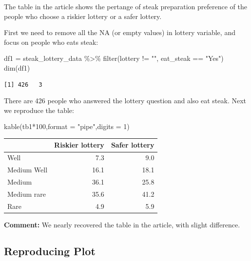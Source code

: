 \documentclass[
  letterpaper,
  DIV=11,
  numbers=noendperiod]{scrartcl}
\newenvironment{Shaded}{\begin{snugshade}}{\end{snugshade}}
\newcommand{\AttributeTok}[1]{\textcolor[rgb]{0.40,0.45,0.13}{#1}}
\newcommand{\DecValTok}[1]{\textcolor[rgb]{0.68,0.00,0.00}{#1}}
\newcommand{\FunctionTok}[1]{\textcolor[rgb]{0.28,0.35,0.67}{#1}}
\newcommand{\NormalTok}[1]{\textcolor[rgb]{0.00,0.23,0.31}{#1}}
\newcommand{\OtherTok}[1]{\textcolor[rgb]{0.00,0.23,0.31}{#1}}
\newcommand{\SpecialCharTok}[1]{\textcolor[rgb]{0.37,0.37,0.37}{#1}}
\newcommand{\StringTok}[1]{\textcolor[rgb]{0.13,0.47,0.30}{#1}}
\begin{document}
The table in the article shows the pertange of steak preparation
preference of the people who choose a riskier lottery or a safer
lottery.

First we need to remove all the NA (or empty values) in lottery
variable, and focus on people who eats steak:

\begin{Shaded}
\begin{Highlighting}[]
\NormalTok{df1 }\OtherTok{=}\NormalTok{ steak\_lottery\_data }\SpecialCharTok{\%\textgreater{}\%}
  \FunctionTok{filter}\NormalTok{(lottery }\SpecialCharTok{!=} \StringTok{""}\NormalTok{, eat\_steak }\SpecialCharTok{==} \StringTok{"Yes"}\NormalTok{)}
\FunctionTok{dim}\NormalTok{(df1)}
\end{Highlighting}
\end{Shaded}

\begin{verbatim}
[1] 426   3
\end{verbatim}

There are 426 people who answered the lottery question and also eat
steak. Next we reproduce the table:

\begin{Shaded}
\begin{Highlighting}[]
\FunctionTok{kable}\NormalTok{(tb1}\SpecialCharTok{*}\DecValTok{100}\NormalTok{,}\AttributeTok{format =} \StringTok{"pipe"}\NormalTok{,}\AttributeTok{digits =} \DecValTok{1}\NormalTok{)}
\end{Highlighting}
\end{Shaded}

\begin{longtable}[]{@{}lrr@{}}
\toprule\noalign{}
& Riskier lottery & Safer lottery \\
\midrule\noalign{}
\endhead
\bottomrule\noalign{}
\endlastfoot
Well & 7.3 & 9.0 \\
Medium Well & 16.1 & 18.1 \\
Medium & 36.1 & 25.8 \\
Medium rare & 35.6 & 41.2 \\
Rare & 4.9 & 5.9 \\
\end{longtable}

\textbf{Comment:} We nearly recovered the table in the article, with
slight difference.

\subsection{Reproducing Plot}\label{reproducing-plot}
\end{document}
